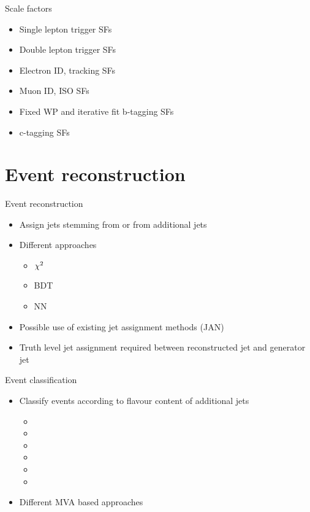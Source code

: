\documentclass[18pt]{beamer}
\begin{document}
\begin{frame}{Scale factors}
	\begin{itemize}
		\item Single lepton trigger SFs
		\item {\color{red}Double lepton trigger SFs}
		\item Electron ID, tracking SFs
		\item Muon ID, ISO SFs
		\item Fixed WP and iterative fit b-tagging SFs
		\item {\color{red}c-tagging SFs}
	\end{itemize}
\end{frame}

\section{Event reconstruction}
\begin{frame}{Event reconstruction}
	\begin{itemize}
		\item Assign jets stemming from \ttbar or from additional jets
		\item Different approaches
		\begin{itemize}
			\item $\chi^2$
			\item BDT
			\item NN
		\end{itemize}
		\item Possible use of existing jet assignment methods (JAN)
		\item Truth level jet assignment required between reconstructed jet and generator jet
	\end{itemize}
\end{frame}

\begin{frame}{Event classification}
	\begin{itemize}
		\item Classify events according to flavour content of additional jets
		\begin{itemize}
			\item \ttbb
			\item \ttb
			\item \ttcc
			\item \ttc
			\item \ttlf
			\item \ttother
		\end{itemize}
		\item Different MVA based approaches
	\end{itemize}
\end{frame}



% 
%
%
\end{document}
